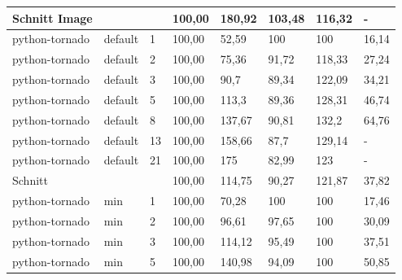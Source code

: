 \begin{footnotesize}
\begin{longtable}{llllllll}
		Schnitt Image  &         &            & 100,00 & 180,92                      & 103,48                      & 116,32                      & -                           \\ \hline
		python-tornado & default & 1          & 100,00 & 52,59                       & \cellcolor[HTML]{C0C0C0}100 & \cellcolor[HTML]{C0C0C0}100 & 16,14                       \\
		python-tornado & default & 2          & 100,00 & 75,36                       & 91,72                       & 118,33                      & 27,24                       \\
		python-tornado & default & 3          & 100,00 & 90,7                        & 89,34                       & 122,09                      & 34,21                       \\
		python-tornado & default & 5          & 100,00 & 113,3                       & 89,36                       & 128,31                      & 46,74                       \\
		python-tornado & default & 8          & 100,00 & 137,67                      & 90,81                       & 132,2                       & 64,76                       \\
		python-tornado & default & 13         & 100,00 & 158,66                      & 87,7                        & 129,14                      & -                           \\
		python-tornado & default & 21         & 100,00 & 175                         & 82,99                       & 123                         & -                           \\ \hline
		Schnitt        &         &            & 100,00 & 114,75                      & 90,27                       & 121,87                      & 37,82                       \\ \hline
		python-tornado & min     & 1          & 100,00 & 70,28                       & \cellcolor[HTML]{C0C0C0}100 & \cellcolor[HTML]{C0C0C0}100 & 17,46                       \\
		python-tornado & min     & 2          & 100,00 & 96,61                       & 97,65                       & \cellcolor[HTML]{C0C0C0}100 & 30,09                       \\
		python-tornado & min     & 3          & 100,00 & 114,12                      & 95,49                       & \cellcolor[HTML]{C0C0C0}100 & 37,51                       \\
		python-tornado & min     & 5          & 100,00 & 140,98                      & 94,09                       & \cellcolor[HTML]{C0C0C0}100 & 50,85                       \\

\end{longtable}
\end{footnotesize}
